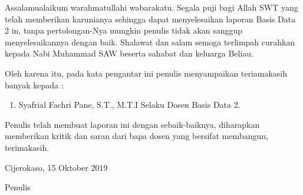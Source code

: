 \begin{acknowledgements}
Assalamualaikum warahmatullahi wabarakatu. Segala puji bagi Allah SWT yang telah memberikan karunianya sehingga dapat menyelesaikan laporan Basis Data 2 in, tanpa pertolongan-Nya mungkin penulis tidak akan sanggup menyelesaikannya dengan baik. Shalawat dan salam semoga terlimpah curahkan kepada Nabi Muhammad SAW beserta sahabat dan keluarga Beliau.

Oleh karena itu, pada kata pengantar ini penulis menyampaikan teriamakasih banyak kepada :
\begin{enumerate}

\item  Syafrial Fachri Pane, S.T., M.T.I Selaku Dosen Basis Data 2.
\end{enumerate}

Penulis telah membuat laporan ini dengan sebaik-baiknya, diharapkan memberikan kritik dan saran dari bapa dosen yang bersifat membangun, terimakasih.

\begin{raggedleft}

Cijerokaso, 15 Oktober 2019


Penulis

\end{raggedleft}

\end{acknowledgements}